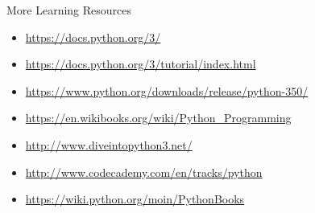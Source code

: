 \begin{frame}{More Learning Resources}
  \begin{itemize}
    \item \url{https://docs.python.org/3/}
    \item \url{https://docs.python.org/3/tutorial/index.html}
    \item \url{https://www.python.org/downloads/release/python-350/}
    \item \url{https://en.wikibooks.org/wiki/Python\_Programming}
    \item \url{http://www.diveintopython3.net/}
    \item \url{http://www.codecademy.com/en/tracks/python}
    \item \url{https://wiki.python.org/moin/PythonBooks}
  \end{itemize}
\end{frame}


